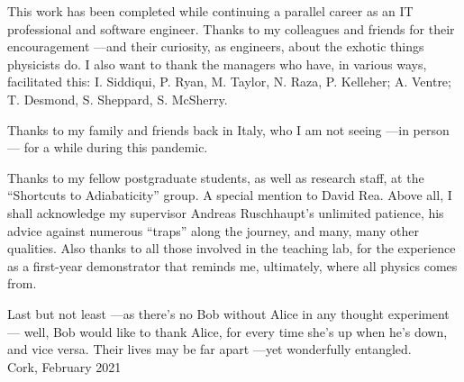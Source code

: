 {
  This work has been completed while continuing a parallel career
  as an IT professional and software engineer.
  Thanks to my
  colleagues and friends for their encouragement
  ---and their curiosity,
  as engineers,
  about the exhotic things physicists do.
  I also want to thank the managers
  who have, in various ways, facilitated this:
  I. Siddiqui, P. Ryan, M. Taylor, N. Raza, P. Kelleher;
  A. Ventre;
  T. Desmond, S. Sheppard, S. McSherry.
  
  Thanks to my family and friends back in Italy,
  who I am not seeing ---in person--- for a while during this pandemic.

  Thanks to my fellow postgraduate students,
  as well as research staff,
  at the ``Shortcuts to Adiabaticity'' group.
  A special mention to David Rea.
  Above all, I shall acknowledge my supervisor Andreas Ruschhaupt's unlimited patience,
  his advice against numerous ``traps'' along the journey, and many, many other qualities.
  Also thanks to all those involved in the teaching lab, for the experience as a
  first-year demonstrator that reminds me, ultimately, where all physics comes from.

  Last but not least ---as there's no Bob without Alice in any thought ex\-per\-i\-ment---
  well, Bob would like to thank Alice,
  for every time she’s up when he’s down, and vice versa.
  Their lives may be far apart ---yet
  wonderfully entangled.
  \\

  Cork, February 2021
}